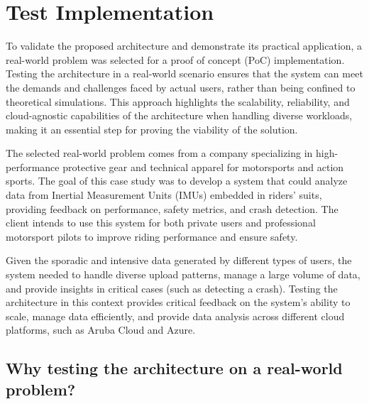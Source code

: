 \chapter{Test Implementation}
\label{cap:real_implementation}

To validate the proposed architecture and demonstrate its practical application, a real-world problem was selected for a proof of concept (PoC) implementation. Testing the architecture in a real-world scenario ensures that the system can meet the demands and challenges faced by actual users, rather than being confined to theoretical simulations. This approach highlights the scalability, reliability, and cloud-agnostic capabilities of the architecture when handling diverse workloads, making it an essential step for proving the viability of the solution.

The selected real-world problem comes from a company specializing in high-performance protective gear and technical apparel for motorsports and action sports. The goal of this case study was to develop a system that could analyze data from Inertial Measurement Units (IMUs) embedded in riders’ suits, providing feedback on performance, safety metrics, and crash detection. The client intends to use this system for both private users and professional motorsport pilots to improve riding performance and ensure safety.

Given the sporadic and intensive data generated by different types of users, the system needed to handle diverse upload patterns, manage a large volume of data, and provide insights in critical cases (such as detecting a crash). Testing the architecture in this context provides critical feedback on the system’s ability to scale, manage data efficiently, and provide data analysis across different cloud platforms, such as Aruba Cloud and Azure.

\section{Why testing the architecture on a real-world problem?}
\label{sec:real_world_problem}

